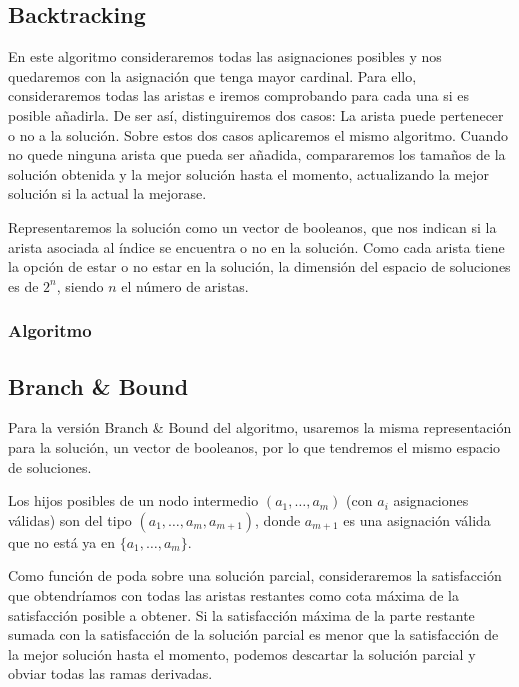 \documentclass[a4paper, 11pt]{article} %
\begin{document}
        \subsection{Backtracking}
	  En este algoritmo consideraremos todas las asignaciones posibles y nos quedaremos con la asignación que tenga mayor cardinal. 
	  Para ello, consideraremos todas las aristas e iremos comprobando para cada una si es posible añadirla. De ser así, distinguiremos 
	  dos casos: La arista puede pertenecer o no a la solución. Sobre estos dos casos aplicaremos el mismo algoritmo. Cuando no quede
	  ninguna arista que pueda ser añadida, compararemos los tamaños de la solución obtenida y la mejor solución hasta el momento, 
	  actualizando la mejor solución si la actual la mejorase. 
	  
	  Representaremos la solución como un vector de booleanos, que nos indican si la arista asociada al índice se encuentra o 
	  no en la solución. Como cada arista tiene la opción de estar o no estar en la solución, la dimensión del espacio de 
	  soluciones es de $2^n$, siendo $n$ el número de aristas.
	  
	  \subsubsection{Algoritmo}
	    \small
	    \texttt{}
	    \normalsize
	  
        \subsection{Branch \& Bound}
	  Para la versión Branch \& Bound del algoritmo, usaremos la misma representación para la solución, 
	  un vector de booleanos, por lo que tendremos el mismo espacio de soluciones.
	  
	  Los hijos posibles de un nodo intermedio $(a_1, \dots, a_m)$ (con $a_i$ asignaciones válidas) son del tipo 
	  $(a_1, \dots, a_m, a_{m+1})$, donde $a_{m+1}$ es una asignación válida que no está ya en $\{a_1, \dots, a_m\}$.
	  
	  Como función de poda sobre una solución parcial, consideraremos la satisfacción que obtendríamos con todas 
	  las aristas restantes como cota máxima de la satisfacción posible a obtener. Si la satisfacción máxima de 
	  la parte restante sumada con la satisfacción de la solución parcial es menor que la satisfacción de la mejor 
	  solución hasta el momento, podemos descartar la solución parcial y obviar todas las ramas derivadas. 
	  
\end{document}
